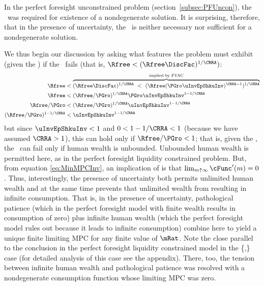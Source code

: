\documentclass[./BufferStockTheory.tex]{subfiles}
\begin{document}
In the perfect foresight unconstrained problem
(section~\ref{subsec:PFUncon}), the \RIC~was required for existence of
a nondegenerate solution.  It is surprising, therefore, that in the
presence of uncertainty, the \RIC~is neither necessary nor sufficient
for a nondegenerate solution.
\begin{comment}
But if the \RIC~does hold, some useful results can be derived.  Arguably
the most fundamental are that the limiting values
for the minimal and maximal marginal propensities to consume implicit in
\eqref{eq:MaxMPCInv} and \eqref{eq:MinMPCInv} are positive and finite.
\end{comment}
We thus begin our discussion by asking what features the problem must
exhibit (given the \FVAC) if the \RIC~fails (that is, $\Rfree < (\Rfree \DiscFac)^{1/\CRRA})$:
\begin{equation}\begin{gathered}\begin{aligned}
    \Rfree   & < \overbrace{(\Rfree \DiscFac)^{1/\CRRA} ~ < ~ (\Rfree (\PGro \uInvEpShkuInv)^{\CRRA-1})^{1/\CRRA}}^{\text{implied by \FVAC}} \notag
\\  \Rfree   & < (\Rfree/\PGro)^{1/\CRRA}\PGro \uInvEpShkuInv^{1-1/\CRRA} \notag
\\  \Rfree/\PGro  & < (\Rfree/\PGro)^{1/\CRRA}\uInvEpShkuInv^{1-1/\CRRA} \notag
\\  (\Rfree/\PGro)^{1-1/\CRRA}  & < \uInvEpShkuInv^{1-1/\CRRA} \label{eq:RICimplies}
\end{aligned}\end{gathered}\end{equation}
but since $\uInvEpShkuInv<1$ and $0 < 1-1/\CRRA < 1$ (because we have
assumed $\CRRA > 1$), this can hold only if $\Rfree/\PGro < 1$; that
is, given the \FVAC, the \RIC~can fail only if human wealth is
unbounded.  Unbounded human wealth is permitted here, as in the
perfect foresight liquidity constrained problem.  But,
 from  equation
\eqref{eq:MinMPCInv}, an implication of \cncl{\RIC} is that $\lim_{m
  \uparrow \infty} \cFunc^{\prime}(m) = 0$.  Thus, interestingly,
the presence of uncertainty both permits unlimited human wealth and at
the same time prevents that unlimited wealth from resulting in
infinite consumption.  That is, in the presence of uncertainty,
pathological patience (which in the perfect foresight model with
finite wealth results in consumption of zero) plus infinite human
wealth (which the perfect foresight model rules out because it leads
to infinite consumption) combine here to yield a unique finite
limiting MPC for any finite value of $\mRat$.  Note
the close parallel to the conclusion in the perfect foresight
liquidity constrained model in the
\{\PFGIC,\} case (for detailed analysis of this
case see the appendix).  There, too, the tension between infinite human wealth
and pathological patience was resolved with a nondegenerate consumption function
whose limiting MPC was zero.
\end{document}
